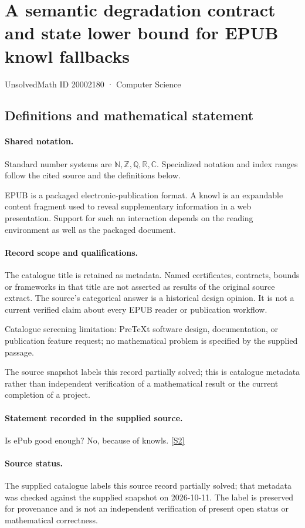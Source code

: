 \documentclass[11pt]{article}
\newcommand{\sref}[2]{\hyperlink{source:#1:#2}{[S#2]}}
\begin{document}
\setcounter{section}{20002179}
\section{A semantic degradation contract and state lower bound for EPUB knowl fallbacks}\label{20002180}
{\small\sffamily UnsolvedMath ID 20002180 · Computer Science}
\subsection{Definitions and mathematical statement}

\paragraph{Shared notation.}Standard number systems are $\mathbb N,\mathbb Z,\mathbb Q,\mathbb R,\mathbb C$. Specialized notation and index ranges follow the cited source and the definitions below.


EPUB is a packaged electronic-publication format. A knowl is an expandable content fragment used to reveal supplementary information in a web presentation. Support for such an interaction depends on the reading environment as well as the packaged document.
\paragraph{Record scope and qualifications.}
The catalogue title is retained as metadata. Named certificates, contracts, bounds or frameworks in that title are not asserted as results of the original source extract.
The source's categorical answer is a historical design opinion. It is not a current verified claim about every EPUB reader or publication workflow.

Catalogue screening limitation: PreTeXt software design, documentation, or publication feature request; no mathematical problem is specified by the supplied passage.

The source snapshot labels this record partially solved; this is catalogue metadata rather than independent verification of a mathematical result or the current completion of a project.
\paragraph{Statement recorded in the supplied source.}
Is ePub good enough? No, because of knowls. \sref{20002180}{2}
\paragraph{Source status.}
The supplied catalogue labels this source record partially solved; that metadata was checked against the supplied snapshot on 2026-10-11. The label is preserved for provenance and is not an independent verification of present open status or mathematical correctness.
\end{document}
